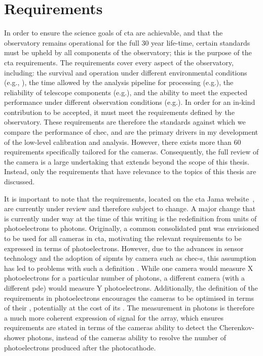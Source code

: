\section{Requirements}

In order to ensure the science goals of \gls{cta} are achievable, and that the observatory remains operational for the full 30 year life-time, certain standards must be upheld by all components of the observatory; this is the purpose of the \gls{cta} requirements. The requirements cover every aspect of the observatory, including: the survival and operation under different environmental conditions (e.g.\@ {}, ), the time allowed by the analysis pipeline for processing (e.g.\@ {}), the reliability of telescope components (e.g.\@ {}), and the ability to meet the expected performance under different observation conditions (e.g.\@ {}). In order for an in-kind contribution to be accepted, it must meet the requirements defined by the observatory. These requirements are therefore the standards against which we compare the performance of \gls{chec}, and are the primary drivers in my development of the low-level calibration and analysis. However, there exists more than 60 requirements specifically tailored for the cameras. Consequently, the full review of the camera is a large undertaking that extends beyond the scope of this thesis. Instead, only the requirements that have relevance to the topics of this thesis are discussed.

It is important to note that the requirements, located on the \gls{cta} Jama website~\cite{cta-jama}, are currently under review and therefore subject to change. A major change that is currently under way at the time of this writing is the redefinition from units of photoelectrons to photons. Originally, a common consolidated \gls{pmt} was envisioned to be used for all cameras in \gls{cta}, motivating the relevant requirements to be expressed in terms of photoelectrons. However, due to the advances in sensor technology and the adoption of \glspl{sipmt} by camera such as \gls{chec-s}, this assumption has led to problems with such a definition \cite{petophotons}. While one camera would measure X photoelectrons for a particular number of photons, a different camera (with a different \gls{pde}) would measure Y photoelectrons. Additionally, the definition of the requirements in photoelectrons encourages the cameras to be optimised in terms of their , potentially at the cost of its . The measurement in photons is therefore a much more coherent expression of signal for the array, which ensures requirements are stated in terms of the cameras ability to detect the Cherenkov-shower photons, instead of the cameras ability to resolve the number of photoelectrons produced after the photocathode. 

